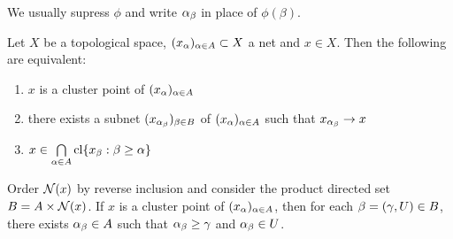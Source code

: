 \documentclass{book}
\begin{document}
	\begin{note}
		We usually supress $\phi$ and write $\alpha_{\beta}$ in place of ${\phi(\beta)}$.
	\end{note}
	
	\begin{ex} 
	Let $X$ be a topological space, $(x_{\alpha})_{\alpha \in A} \subset X$ a net and $x \in X$. Then the following are equivalent: 
	\begin{enumerate}
		\item $x$ is a cluster point of $(x_{\alpha})_{\alpha \in A}$
		\item there exists a subnet $(x_{\alpha_{\beta}})_{\beta \in B}$ of $(x_{\alpha})_{\alpha \in A}$ such that $x_{\alpha_{\beta}} \rightarrow x$
		\item $x \in \bigcap\limits_{\alpha \in A} \operatorname{cl} \{x_{\beta}: \beta \geq \alpha\}$
	\end{enumerate}
	 Order $\mathcal{N}(x)$ by reverse inclusion and consider the product directed set $B = A \times \mathcal{N}(x)$. If $x$ is a cluster point of $(x_{\alpha})_{\alpha \in A}$, then for each $\beta = (\gamma, U) \in B$, there exists $\alpha_{\beta} \in A$ such that $\alpha_{\beta} \geq \gamma$ and $\alpha_{\beta} \in U$. 
	\end{ex}
\end{document}
